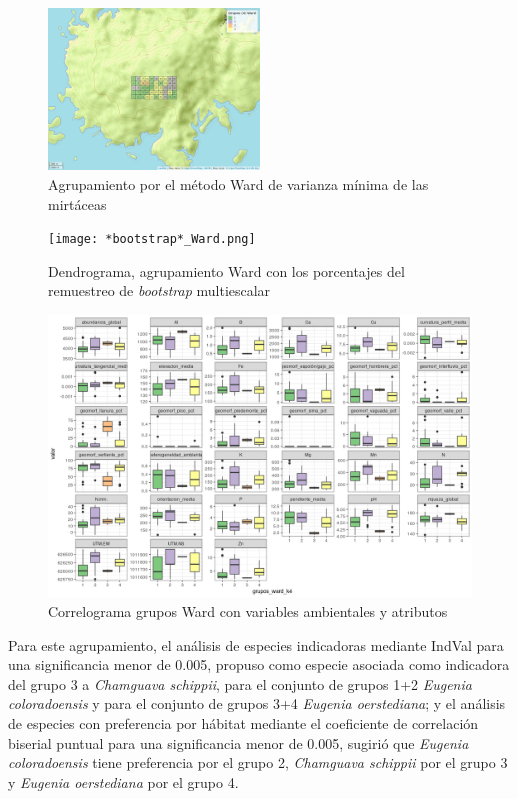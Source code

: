 \documentclass[11pt,]{article}
\begin{document}
\begin{figure}
\centering
\includegraphics[width=0.50000\textwidth]{mapa_ward_k4.png}
\caption{Agrupamiento por el método Ward de varianza mínima de las
mirtáceas \label{fig:mapa_ward}}
\end{figure}

\begin{figure}
\centering
\texttt{[image: *bootstrap*\_Ward.png]}
\caption{Dendrograma, agrupamiento Ward con los porcentajes del
remuestreo de \emph{bootstrap} multiescalar
\label{fig:*bootstrap*_multiescalar}}
\end{figure}

\begin{figure}
\centering
\includegraphics{correlograma_wardyvariablesambientales.png}
\caption{Correlograma grupos Ward con variables ambientales y atributos
\label{fig:ward_con_variables}}
\end{figure}

Para este agrupamiento, el análisis de especies indicadoras mediante
IndVal para una significancia menor de 0.005, propuso como especie
asociada como indicadora del grupo 3 a \emph{Chamguava schippii}, para
el conjunto de grupos 1+2 \emph{Eugenia coloradoensis} y para el
conjunto de grupos 3+4 \emph{Eugenia oerstediana}; y el análisis de
especies con preferencia por hábitat mediante el coeficiente de
correlación biserial puntual para una significancia menor de 0.005,
sugirió que \emph{Eugenia coloradoensis} tiene preferencia por el grupo
2, \emph{Chamguava schippii} por el grupo 3 y \emph{Eugenia oerstediana}
por el grupo 4.
\end{document}
